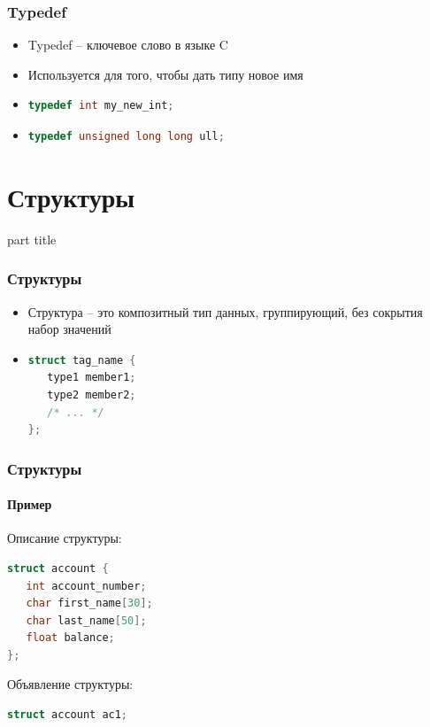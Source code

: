 \documentclass[14pt,pdf,hyperref={unicode}]{beamer}
\begin{document}
\begin{frame}[fragile]
\frametitle{Typedef} 
\begin{itemize}
\item Typedef -- ключевое слово в языке C \\
\item Используется для того, чтобы дать типу новое имя \\
\item 
\begin{lstlisting}[language=C++,basicstyle=\ttfamily,keywordstyle=\color{blue}]
typedef int my_new_int;
\end{lstlisting}
\item 
\begin{lstlisting}[language=C++,basicstyle=\ttfamily,keywordstyle=\color{blue}]
typedef unsigned long long ull;
\end{lstlisting}
\end{itemize}
\end{frame}




\section{Структуры}
\begin{frame}
\begin{center}
\begin{beamercolorbox}[sep=8pt,center]{part
title}
\insertsection
\end{beamercolorbox}
\end{center}
\end{frame}




\begin{frame}[fragile]
\frametitle{Структуры} 
\begin{itemize}
\item Структура -- это композитный тип данных, группирующий, без сокрытия набор значений \\
\item 
\begin{lstlisting}[language=C++,basicstyle=\ttfamily,keywordstyle=\color{blue}]
struct tag_name {
   type1 member1;
   type2 member2;
   /* ... */
};
\end{lstlisting}
\end{itemize}
\end{frame}


\begin{frame}[fragile]
\frametitle{Структуры} 
\framesubtitle{Пример} 
Описание структуры:
\begin{lstlisting}[language=C++,basicstyle=\ttfamily,keywordstyle=\color{blue}]
struct account {
   int account_number;
   char first_name[30];
   char last_name[50];
   float balance;
};
\end{lstlisting}
Объявление структуры:
\begin{lstlisting}[language=C++,basicstyle=\ttfamily,keywordstyle=\color{blue}]
struct account ac1;
\end{lstlisting}
\end{frame}
\end{document}

